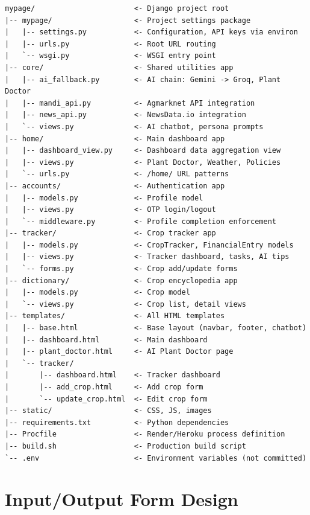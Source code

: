 \documentclass[12pt,a4paper]{article}
\begin{document}
\begin{lstlisting}[caption={Project Directory Structure}, label={lst:dirstructure}]
mypage/                       <- Django project root
|-- mypage/                   <- Project settings package
|   |-- settings.py           <- Configuration, API keys via environ
|   |-- urls.py               <- Root URL routing
|   `-- wsgi.py               <- WSGI entry point
|-- core/                     <- Shared utilities app
|   |-- ai_fallback.py        <- AI chain: Gemini -> Groq, Plant Doctor
|   |-- mandi_api.py          <- Agmarknet API integration
|   |-- news_api.py           <- NewsData.io integration
|   `-- views.py              <- AI chatbot, persona prompts
|-- home/                     <- Main dashboard app
|   |-- dashboard_view.py     <- Dashboard data aggregation view
|   |-- views.py              <- Plant Doctor, Weather, Policies
|   `-- urls.py               <- /home/ URL patterns
|-- accounts/                 <- Authentication app
|   |-- models.py             <- Profile model
|   |-- views.py              <- OTP login/logout
|   `-- middleware.py         <- Profile completion enforcement
|-- tracker/                  <- Crop tracker app
|   |-- models.py             <- CropTracker, FinancialEntry models
|   |-- views.py              <- Tracker dashboard, tasks, AI tips
|   `-- forms.py              <- Crop add/update forms
|-- dictionary/               <- Crop encyclopedia app
|   |-- models.py             <- Crop model
|   `-- views.py              <- Crop list, detail views
|-- templates/                <- All HTML templates
|   |-- base.html             <- Base layout (navbar, footer, chatbot)
|   |-- dashboard.html        <- Main dashboard
|   |-- plant_doctor.html     <- AI Plant Doctor page
|   `-- tracker/
|       |-- dashboard.html    <- Tracker dashboard
|       |-- add_crop.html     <- Add crop form
|       `-- update_crop.html  <- Edit crop form
|-- static/                   <- CSS, JS, images
|-- requirements.txt          <- Python dependencies
|-- Procfile                  <- Render/Heroku process definition
|-- build.sh                  <- Production build script
`-- .env                      <- Environment variables (not committed)
\end{lstlisting}

\section{Input/Output Form Design}
\end{document}
